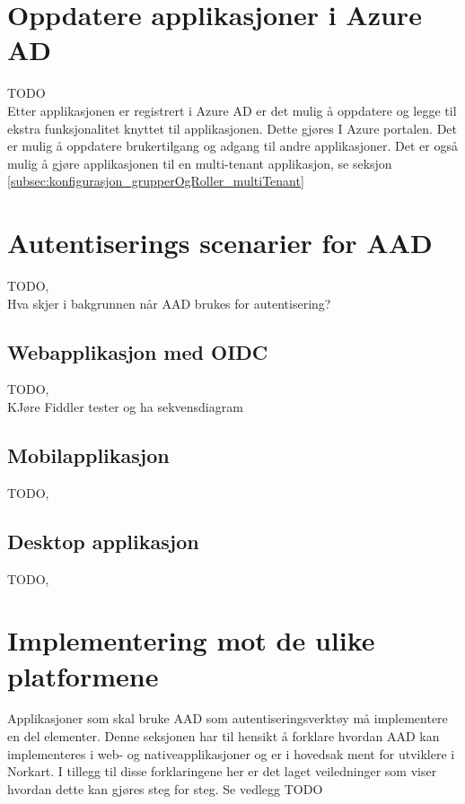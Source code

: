 \section{Oppdatere applikasjoner i Azure AD}
\label{sec:konfigurasjon_leggTilApplikasjonIAzureAD_oppdatereApplikasjonIAzureAD}
{\color{red}TODO} \\

Etter applikasjonen er registrert i Azure AD er det mulig å oppdatere og legge til ekstra funksjonalitet knyttet til applikasjonen. Dette gjøres I Azure portalen. Det er mulig å oppdatere brukertilgang og adgang til andre applikasjoner. Det er også mulig å gjøre applikasjonen til en multi-tenant applikasjon, se seksjon \ref{subsec:konfigurasjon_grupperOgRoller_multiTenant}

\section{Autentiserings scenarier for AAD}
\label{sec:konfigurasjon_autentiseringsScenarierForAAD}
{\color{red}TODO, } \\
Hva skjer i bakgrunnen når AAD brukes for autentisering? 

\subsection{Webapplikasjon med OIDC}
\label{subsec:konfigurasjon_autentiseringsScenarierForAAD_webapplikasjonMedOIDC}
{\color{red}TODO, } \\
KJøre Fiddler tester og ha sekvensdiagram \\

\subsection{Mobilapplikasjon}
\label{subsec:konfigurasjon_autentiseringsScenarierForAAD_mobilApplikasjon}
{\color{red}TODO, } \\

\subsection{Desktop applikasjon}
\label{subsec:konfigurasjon_autentiseringsScenarierForAAD_desktopApplikasjon}
{\color{red}TODO, } \\

\section{Implementering mot de ulike platformene}
\label{sec:konfigurasjon_implementeringnMotDeUlikePlatformene}
Applikasjoner som skal bruke AAD som autentiseringsverktøy må implementere en del elementer. Denne seksjonen har til hensikt å forklare hvordan AAD kan implementeres i web- og nativeapplikasjoner  og er i hovedsak ment for utviklere i Norkart. I tillegg til disse forklaringene her er det laget veiledninger som viser hvordan dette kan gjøres steg for steg. Se vedlegg {\color{red}TODO} \\ 

